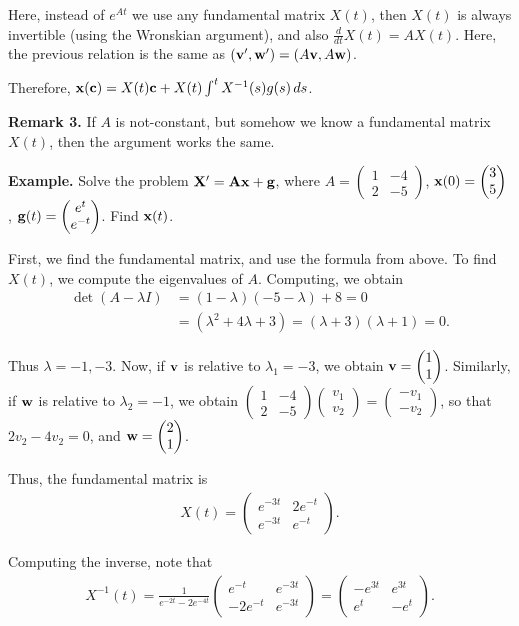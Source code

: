 \documentclass{article}
\newcommand{\mat}[1]{\begin{pmatrix}#1\end{pmatrix}}
\begin{document}
Here, instead of $e^{At}$ we use any fundamental matrix $X(t)$, then $X(t)$ is always invertible (using the Wronskian argument), and also $\frac{d}{dt} X(t) = A X(t)$. Here, the previous relation is the same as $(\mathbf{v}', \mathbf{w}') = (A \mathbf{v}, A \mathbf{w})$.

Therefore, $\mathbf{x}(\mathbf{c}) = X(t) \mathbf{c} + X(t) \int^{t} X^{-1}(s) g(s) \, ds$.

{\bf Remark 3.} If $A$ is not-constant, but somehow we know a fundamental matrix $X(t)$, then the argument works the same.

{\bf Example.} Solve the problem $\mathbf{X}' = \mathbf{A} \mathbf{x} + \mathbf{g}$, where $A = \mat{1 & -4 \\ 2 & -5}$, $\mbf{x}(0) = \mat{3 \\ 5}$, $\mbf{g}(t) = \mat{e^t \\ e^{-t}}$.  Find $\mathbf{x}(t)$.

First, we find the fundamental matrix, and use the formula from above.  To find $X(t)$, we compute the eigenvalues of $A$.  Computing, we obtain
\begin{align*}
  \det (A - \lambda I) &= (1 - \lambda)(-5 - \lambda) + 8 = 0 \\
  &= (\lambda^2 + 4\lambda + 3) = (\lambda + 3)(\lambda + 1) = 0.
\end{align*}

Thus $\lambda = -1, -3$.  Now, if $\mathbf{v}$ is relative to $\lambda_1 = -3$, we obtain $\mbf{v} = \mat{1 \\ 1}$.  Similarly, if $\mathbf{w}$ is relative to $\lambda_2 = -1$, we obtain $\mat{1 & -4 \\ 2 & -5} \mat{v_1 \\ v_2} = \mat{- v_1 \\ - v_2}$, so that $2 v_2 - 4v_2 = 0$, and $\mbf{w} = \mat{2 \\ 1}$.

Thus, the fundamental matrix is
\begin{align*}
  X(t) = \mat{e^{-3t} & 2 e^{-t} \\ e^{-3t} & e^{-t}}.
\end{align*}

Computing the inverse, note that
\begin{align*}
  X^{-1}(t) = \frac{1}{e^{-2t} - 2 e^{-4t}} \mat{e^{-t} & e^{-3t} \\ -2 e^{-t} & e^{-3t}} = \mat{- e^{3t} & e^{3t} \\ e^t & - e^t}.
\end{align*}
\end{document}
